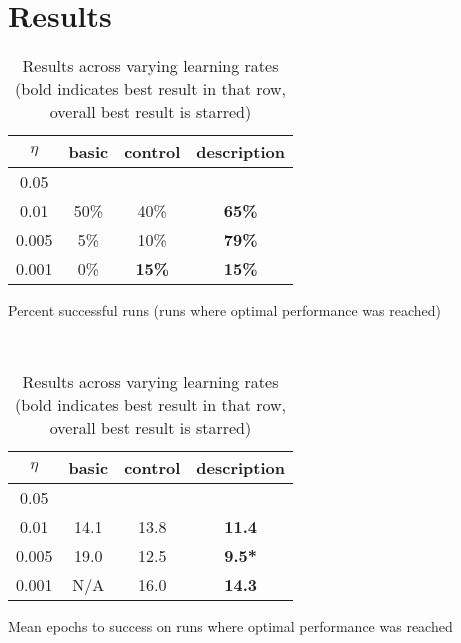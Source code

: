 \documentclass{article} %
\begin{document}
\section{Results}
\begin{table}[H]
\begin{subtable}{0.5\textwidth}
\centering
\begin{tabular}{|c|ccc|}
\hline
\(\eta\) & basic & control & description \\
\hline
0.05 & & & \\
0.01 & 50\% & 40\% & \textbf{65\%} \\ 
0.005 & 5\% & 10\% & \textbf{79\%} \\
0.001 & 0\% & \textbf{15\%} & \textbf{15\%} \\
\hline 
\end{tabular}
\caption{Percent successful runs (runs where optimal performance was reached)}
\label{count_results}
\end{subtable}
~
\begin{subtable}{0.5\textwidth}
\centering
\begin{tabular}{|c|ccc|}
\hline
\(\eta\) & basic & control & description \\
\hline
0.05 & & & \\
0.01 & 14.1 & 13.8 & \textbf{11.4} \\ 
0.005 & 19.0 & 12.5  & \textbf{9.5*}  \\
0.001 & N/A & 16.0  & \textbf{14.3} \\
\hline 
\end{tabular}
\caption{Mean epochs to success on runs where optimal performance was reached}
\label{time_results}
\end{subtable}
\caption{Results across varying learning rates (bold indicates best result in that row, overall best result is starred)}
\end{table}
\end{document}
